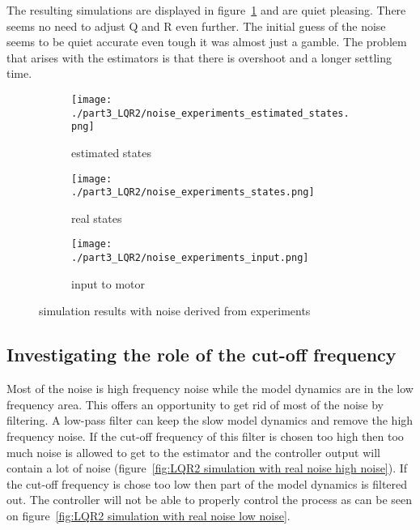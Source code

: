 	The resulting simulations are displayed in figure~\ref{fig:LQR2 simulation with real noise} and are quiet pleasing. There seems no need to adjust Q and R even further. The initial guess of the noise seems to be quiet accurate even tough it was almost just a gamble. The problem that arises with the estimators is that there is overshoot and a longer settling time.
	\begin{figure}[H]
		\centering
		\begin{subfigure}[b]{0.45\textwidth}
			\texttt{[image: ./part3\_LQR2/noise\_experiments\_estimated\_states.png]}
			\caption{estimated states}
		\end{subfigure}
		\begin{subfigure}[b]{0.45\textwidth}
			\texttt{[image: ./part3\_LQR2/noise\_experiments\_states.png]}
			\caption{real states}
		\end{subfigure}
		\begin{subfigure}[b]{0.45\textwidth}
			\texttt{[image: ./part3\_LQR2/noise\_experiments\_input.png]}
			\caption{input to motor}
		\end{subfigure}
		\caption{simulation results with noise derived from experiments}
		\label{fig:LQR2 simulation with real noise}
	\end{figure}

\subsection{Investigating the role of the cut-off frequency}
Most of the noise is high frequency noise while the model dynamics are in the low frequency area. This offers an opportunity to get rid of most of the noise by filtering. A low-pass filter can keep the slow model dynamics and remove the high frequency noise. If the cut-off frequency of this filter is chosen too high then too much noise is allowed to get to the estimator and the controller output will contain a lot of noise (figure~\ref{fig:LQR2 simulation with real noise high noise}). If the cut-off frequency is chose too low then part of the model dynamics is filtered out. The controller will not be able to properly control the process as can be seen on figure~\ref{fig:LQR2 simulation with real noise low noise}.

